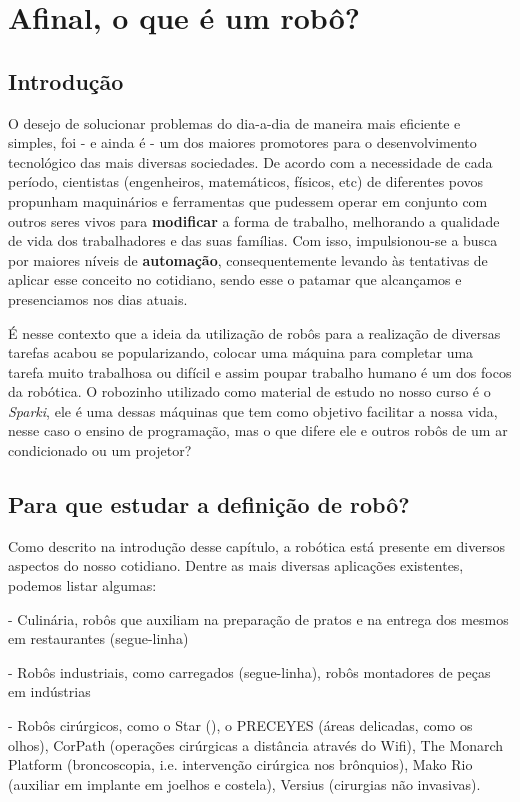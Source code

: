 \chapter{Afinal, o que é um robô?}
\section*{Introdução}
O desejo de solucionar problemas do dia-a-dia de maneira mais eficiente e simples, foi - e ainda é - um dos maiores promotores para o desenvolvimento tecnológico das mais diversas sociedades. De acordo com a necessidade de cada período, cientistas (engenheiros, matemáticos, físicos, etc) de diferentes povos propunham maquinários e ferramentas que pudessem operar em conjunto com outros seres vivos para \textbf{modificar} a forma de trabalho, melhorando a qualidade de vida dos trabalhadores e das suas famílias. Com isso, impulsionou-se a busca por maiores níveis de \textbf{automação}, consequentemente levando às tentativas de aplicar esse conceito no cotidiano, sendo esse o patamar que alcançamos e presenciamos nos dias atuais. \par
É nesse contexto que a ideia da utilização de robôs para a realização de diversas tarefas acabou se popularizando, colocar uma máquina para completar uma tarefa muito trabalhosa ou difícil e assim poupar trabalho humano é um dos focos da robótica. O robozinho utilizado como material de estudo no nosso curso é o \textit{Sparki}, ele é uma dessas máquinas que tem como objetivo facilitar a nossa vida, nesse caso o ensino de programação, mas o que difere ele e outros robôs de um ar condicionado ou um projetor?



\section{Para que estudar a definição de robô?}
Como descrito na introdução desse capítulo, a robótica está presente em diversos aspectos do nosso cotidiano. Dentre as mais diversas aplicações existentes, podemos listar algumas:


- Culinária, robôs que auxiliam na preparação de pratos e na entrega dos mesmos em restaurantes (segue-linha)

- Robôs industriais, como carregados (segue-linha), robôs montadores de peças em indústrias

- Robôs cirúrgicos, como o Star (), o PRECEYES (áreas delicadas, como os olhos), CorPath (operações cirúrgicas a distância através do Wifi), The Monarch Platform (broncoscopia, i.e. intervenção cirúrgica nos brônquios), Mako Rio (auxiliar em implante em joelhos e costela), Versius (cirurgias não invasivas).

